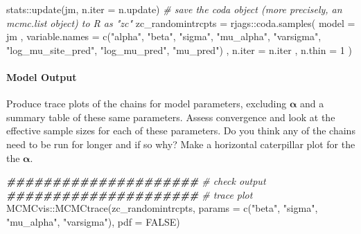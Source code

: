 \documentclass[
]{article}
\newenvironment{Shaded}{\begin{snugshade}}{\end{snugshade}}
\newcommand{\AttributeTok}[1]{\textcolor[rgb]{0.77,0.63,0.00}{#1}}
\newcommand{\CommentTok}[1]{\textcolor[rgb]{0.56,0.35,0.01}{\textit{#1}}}
\newcommand{\ConstantTok}[1]{\textcolor[rgb]{0.00,0.00,0.00}{#1}}
\newcommand{\DecValTok}[1]{\textcolor[rgb]{0.00,0.00,0.81}{#1}}
\newcommand{\DocumentationTok}[1]{\textcolor[rgb]{0.56,0.35,0.01}{\textbf{\textit{#1}}}}
\newcommand{\FunctionTok}[1]{\textcolor[rgb]{0.00,0.00,0.00}{#1}}
\newcommand{\NormalTok}[1]{#1}
\newcommand{\OtherTok}[1]{\textcolor[rgb]{0.56,0.35,0.01}{#1}}
\newcommand{\SpecialCharTok}[1]{\textcolor[rgb]{0.00,0.00,0.00}{#1}}
\newcommand{\StringTok}[1]{\textcolor[rgb]{0.31,0.60,0.02}{#1}}
\begin{document}
\begin{Shaded}
\begin{Highlighting}[]
\NormalTok{stats}\SpecialCharTok{::}\FunctionTok{update}\NormalTok{(jm, }\AttributeTok{n.iter =}\NormalTok{ n.update)}
\CommentTok{\# save the coda object (more precisely, an mcmc.list object) to R as "zc"}
\NormalTok{zc\_randomintrcpts }\OtherTok{=}\NormalTok{ rjags}\SpecialCharTok{::}\FunctionTok{coda.samples}\NormalTok{(}
  \AttributeTok{model =}\NormalTok{ jm}
\NormalTok{  , }\AttributeTok{variable.names =} \FunctionTok{c}\NormalTok{(}\StringTok{"alpha"}\NormalTok{, }\StringTok{"beta"}\NormalTok{, }\StringTok{"sigma"}\NormalTok{, }\StringTok{"mu\_alpha"}\NormalTok{, }\StringTok{"varsigma"}\NormalTok{, }\StringTok{"log\_mu\_site\_pred"}\NormalTok{, }\StringTok{"log\_mu\_pred"}\NormalTok{, }\StringTok{"mu\_pred"}\NormalTok{)}
\NormalTok{  , }\AttributeTok{n.iter =}\NormalTok{ n.iter}
\NormalTok{  , }\AttributeTok{n.thin =} \DecValTok{1}
\NormalTok{)}
\end{Highlighting}
\end{Shaded}

\hypertarget{model-output-2}{%
\paragraph{Model Output}\label{model-output-2}}

Produce trace plots of the chains for model parameters, excluding
\(\boldsymbol{\alpha}\) and a summary table of these same parameters.
Assess convergence and look at the effective sample sizes for each of
these parameters. Do you think any of the chains need to be run for
longer and if so why? Make a horizontal caterpillar plot for the the
\(\boldsymbol{\alpha}\).

\begin{Shaded}
\begin{Highlighting}[]
\DocumentationTok{\#\#\#\#\#\#\#\#\#\#\#\#\#\#\#\#\#\#\#\#\#}
\CommentTok{\# check output}
\DocumentationTok{\#\#\#\#\#\#\#\#\#\#\#\#\#\#\#\#\#\#\#\#\#}
\CommentTok{\# trace plot}
\NormalTok{MCMCvis}\SpecialCharTok{::}\FunctionTok{MCMCtrace}\NormalTok{(zc\_randomintrcpts, }\AttributeTok{params =} \FunctionTok{c}\NormalTok{(}\StringTok{"beta"}\NormalTok{, }\StringTok{"sigma"}\NormalTok{, }\StringTok{"mu\_alpha"}\NormalTok{, }\StringTok{"varsigma"}\NormalTok{), }\AttributeTok{pdf =} \ConstantTok{FALSE}\NormalTok{)}
\end{Highlighting}
\end{Shaded}
\end{document}
